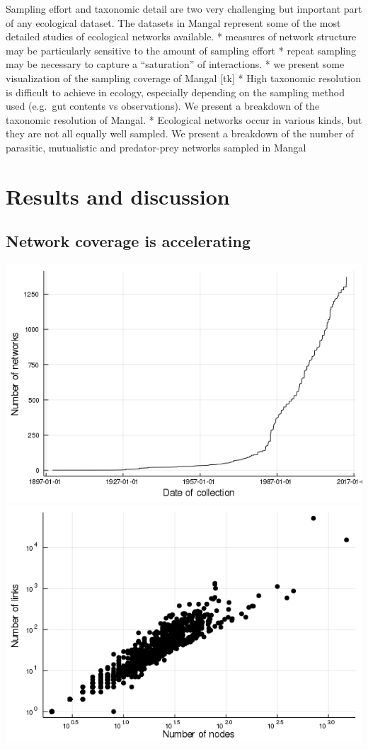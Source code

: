 Sampling effort and taxonomic detail are two very challenging but
important part of any ecological dataset. The datasets in Mangal
represent some of the most detailed studies of ecological networks
available. * measures of network structure may be particularly sensitive
to the amount of sampling effort * repeat sampling may be necessary to
capture a ``saturation'' of interactions. * we present some
visualization of the sampling coverage of Mangal {[}tk{]} * High
taxonomic resolution is difficult to achieve in ecology, especially
depending on the sampling method used (e.g.~gut contents vs
observations). We present a breakdown of the taxonomic resolution of
Mangal. * Ecological networks occur in various kinds, but they are not
all equally well sampled. We present a breakdown of the number of
parasitic, mutualistic and predator-prey networks sampled in Mangal

\hypertarget{results-and-discussion}{%
\section{Results and discussion}\label{results-and-discussion}}

\hypertarget{network-coverage-is-accelerating}{%
\subsection{Network coverage is
accelerating}\label{network-coverage-is-accelerating}}

\includegraphics{figures/figure_01_a.png}
\includegraphics{figures/figure_01_b.png}

